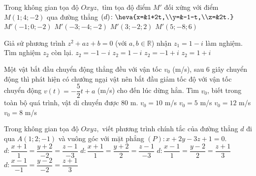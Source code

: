 \begin{ex}%
Trong không gian tọa độ $Oxyz,$ tìm tọa độ điểm $M'$ đối xứng với điểm $M(1; 4; -2)$ qua đường thẳng $(d)\colon \heva{x=&1+2t,\\y=&-1-t,\\z=&2t.}$
\choice
{$M'(-1; 0; -2)$}
{\True $M'(-3; -4; -2)$}
{$M'(3; -2; 2)$}
{$M'(5; -8; 6)$}
\end{ex}

\begin{ex}%
Giả sử phương trình $z^2+az+b=0$ (với $a, b\in\mathbb{R}$) nhận $z_1=1-i$ làm nghiệm. Tìm nghiệm $z_2$ còn lại.
\choice
{$z_2=-1-i$}
{$z_2=1-i$}
{$z_2=-1+i$}
{\True $z_2=1+i$}
\end{ex}



\begin{ex}%
Một vật bắt đầu chuyển động thẳng đều với vận tốc $v_0$ (m/s), sau $6$ giây chuyển động thì phát hiện có chướng ngại vật nên bắt đầu giảm tốc độ với vận tốc chuyển động $v(t)=-\dfrac52t+a$ (m/s) cho đến lúc dừng hẳn. Tìm $v_0$, biết trong toàn bộ quá trình, vật di chuyển được $80$ m.
\choice
{\True $v_0=10$ m/s}
{$v_0=5$ m/s}
{$v_0=12$ m/s}
{$v_0=8$ m/s}
\end{ex}

\begin{ex}%
Trong không gian tọa độ $Oxyz,$ viết phương trình chính tắc của đường thẳng $d$ đi qua $A(1; 2; -1)$ và vuông góc với mặt phẳng $(P)\colon x+2y-3z+1=0.$
\choice
{$d\colon \dfrac{x+1}{1}=\dfrac{y+2}{-2}=\dfrac{z-1}{-3}$}
{$d\colon \dfrac{x+1}{1}=\dfrac{y+2}{2}=\dfrac{z-1}{-3}$}
{$d\colon \dfrac{x-1}{1}=\dfrac{y-2}{2}=\dfrac{z+1}{3}$}
{\True $d\colon \dfrac{x-1}{-1}=\dfrac{y-2}{-2}=\dfrac{z+1}{3}$}
\end{ex}

